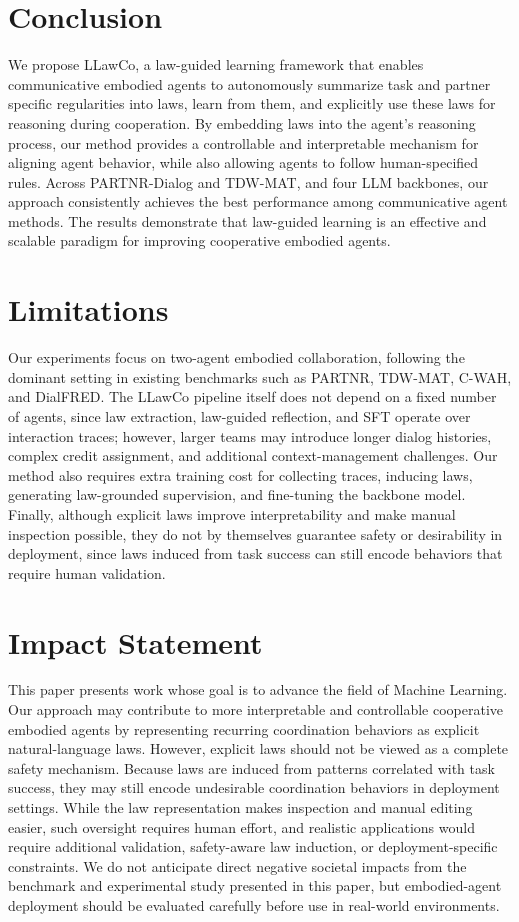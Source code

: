 \documentclass{article}
\theoremstyle{plain}
\theoremstyle{definition}
\theoremstyle{remark}
\newcommand{\name}{LLawCo\xspace}
\begin{document}
\section{Conclusion}

We propose \name, a law-guided learning framework that enables communicative embodied agents to autonomously summarize task and partner specific regularities into laws, learn from them, and explicitly use these laws for reasoning during cooperation. By embedding laws into the agent’s reasoning process, our method provides a controllable and interpretable mechanism for aligning agent behavior, while also allowing agents to follow human-specified rules. Across PARTNR-Dialog and TDW-MAT, and four LLM backbones, our approach consistently achieves the best performance among communicative agent methods. The results demonstrate that law-guided learning is an effective and scalable paradigm for improving cooperative embodied agents.

\section{Limitations}

Our experiments focus on two-agent embodied collaboration, following the dominant setting in existing benchmarks such as PARTNR, TDW-MAT, C-WAH, and DialFRED. The \name pipeline itself does not depend on a fixed number of agents, since law extraction, law-guided reflection, and SFT operate over interaction traces; however, larger teams may introduce longer dialog histories, complex credit assignment, and additional context-management challenges. Our method also requires extra training cost for collecting traces, inducing laws, generating law-grounded supervision, and fine-tuning the backbone model. Finally, although explicit laws improve interpretability and make manual inspection possible, they do not by themselves guarantee safety or desirability in deployment, since laws induced from task success can still encode behaviors that require human validation.

\section*{Impact Statement}

This paper presents work whose goal is to advance the field of Machine Learning. Our approach may contribute to more interpretable and controllable cooperative embodied agents by representing recurring coordination behaviors as explicit natural-language laws. However, explicit laws should not be viewed as a complete safety mechanism. Because laws are induced from patterns correlated with task success, they may still encode undesirable coordination behaviors in deployment settings. While the law representation makes inspection and manual editing easier, such oversight requires human effort, and realistic applications would require additional validation, safety-aware law induction, or deployment-specific constraints. We do not anticipate direct negative societal impacts from the benchmark and experimental study presented in this paper, but embodied-agent deployment should be evaluated carefully before use in real-world environments.
\end{document}
